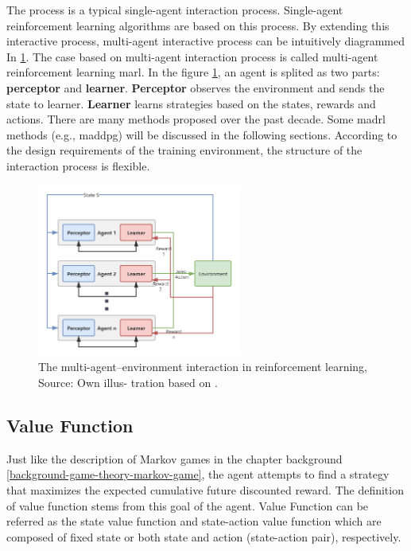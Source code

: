 The process is a typical single-agent interaction process. Single-agent reinforcement learning algorithms are based on this process. By extending this interactive process, multi-agent interactive process can be intuitively diagrammed In \ref{fig:multi-agent-environment-interaction}. The case based on multi-agent interaction process is called multi-agent reinforcement learning \gls{marl}. In the figure \ref{fig:multi-agent-environment-interaction}, an agent is splited as two parts: \textbf{perceptor} and \textbf{learner}. \textbf{Perceptor} observes the environment and sends the state to learner. \textbf{Learner} learns strategies based on the states, rewards and actions. There are many methods proposed over the past decade. Some \gls{madrl} methods (e.g., \gls{maddpg}) will be discussed in the following sections. According to the design requirements of the training environment, the structure of the interaction process is flexible.

\begin{figure}[htbp]
\centering
\includegraphics[width=0.6\textwidth]{./images/multi-agent-environment-interaction.png}
\caption{The multi-agent–environment interaction in reinforcement learning, Source: Own illus-
tration based on \parencite{en13010123}.}
\label{fig:multi-agent-environment-interaction}
\end{figure}

\subsection{Value Function} \label{background:value-function}
Just like the description of Markov games in the chapter background \ref{background-game-theory-markov-game}, the agent attempts to find a strategy that maximizes the expected cumulative future discounted reward. The definition of value function stems from this goal of the agent. Value Function can be referred as the state value function and state-action value function which are composed of fixed state or both state and action (state-action pair), respectively.

